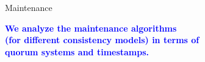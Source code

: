 \documentclass{beamer}
\makeatletter
\newcommand{\citeinbeamer}[3]{{\scriptsize{\textcolor{blue}{[#1@#2'#3]}}}}
\newcommand{\question}[1]{\textcolor{red}{(QUES: #1)}}
\newcommand{\largepurple}[1]{\textcolor{purple}{\large #1}}
\newcommand{\blockblue}[1]{\textcolor{blue}{\bf #1}}
\newcommand{\timestamp}[1]{\emph{\sffamily #1}}
\makeatother
\begin{document}
\begin{frame}[label = maintenance-main]{Maintenance}

  \begin{center}
    \blockblue{We analyze the maintenance algorithms \\ (for different
    consistency models) in terms of \\ quorum systems and timestamps.}

    \hyperlink{maintenance-backup}{}
  \end{center}
%
%
%
%
\end{frame}
\end{document}
